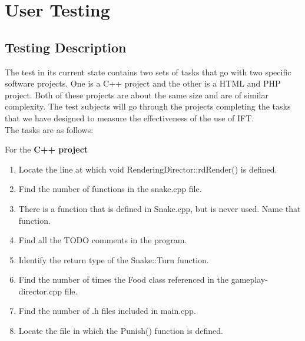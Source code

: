 \documentclass[letterpaper,10pt,titlepage,draftclsnofoot,onecolumn,onesided] {IEEEtran}
\begin{document}
\section{User Testing}
	

	\subsection{Testing Description}
	The test in its current state contains two sets of tasks that go with two specific software projects. 
	One is a C++ project and the other is a HTML and PHP project. 
	Both of these projects are about the same size and are of similar complexity. 
	The test subjects will go through the projects completing the tasks that we have designed to measure the effectiveness of the use of IFT. 
	\\
	The tasks are as follows: 
	
	For the \textbf{C++ project}
	\begin{enumerate}
		\item Locate the line at which void RenderingDirector::rdRender() is defined. 
		\item Find the number of functions in the snake.cpp file.
		\item There is a function that is defined in Snake.cpp, but is never used. Name that function.
		\item Find all the TODO comments in the program.
		\item Identify the return type of the Snake::Turn function.
		\item Find the number of times the Food class referenced in the gameplay-director.cpp file.
		\item Find the number of .h files included in main.cpp.
		\item Locate the file in which the Punish() function is defined.
	\end{enumerate}
	
\end{document}
